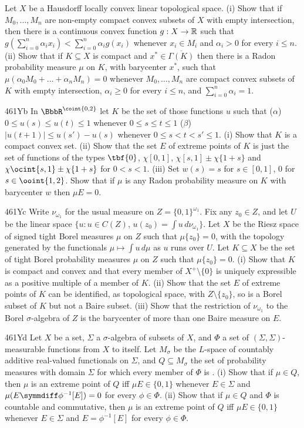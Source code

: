 {
Let $X$ be a Hausdorff locally convex linear topological space.   (i)
Show that if $M_0,\ldots,M_n$ are non-empty compact convex subsets of
$X$ with empty
intersection, then there is a continuous convex function $g:X\to\Bbb R$
such that $g(\sum_{i=0}^n\alpha_ix_i)<\sum_{i=0}^n\alpha_ig(x_i)$
whenever $x_i\in M_i$ and
$\alpha_i>0$ for every $i\le n$.   (ii) Show that if $K\subseteq X$ is
compact and $x^*\in\overline{\Gamma(K)}$ then there is a Radon
probability measure $\mu$ on $K$,
with barycenter $x^*$, such that $\mu(\alpha_0M_0+\ldots+\alpha_nM_n)=0$
whenever $M_0,\ldots,M_n$ are compact convex subsets of $K$ with empty
intersection, $\alpha_i\ge 0$ for every
$i\le n$, and $\sum_{i=0}^n\alpha_i=1$.

\spheader 461Yb
In $\BbbR^{\coint{0,2}}$ let $K$ be the set of those functions $u$ such
that ($\alpha$) $0\le u(s)\le u(t)\le 1$ whenever $0\le s\le t\le 1$
($\beta$) $|u(t+1)|\le u(s')-u(s)$ whenever $0\le s<t<s'\le 1$.   (i)
Show that $K$ is a compact convex set.   (ii) Show that the set $E$ of
extreme points of $K$ is just the set of functions of the types
$\tbf{0}$, $\chi[0,1]$, $\chi[s,1]\pm\chi\{1+s\}$ and
$\chi\ocint{s,1}\pm\chi\{1+s\}$ for $0<s<1$.   (iii) Set $w(s)=s$ for
$s\in[0,1]$, $0$ for $s\in\ooint{1,2}$.   Show that if $\mu$ is any
Radon probability measure on $K$ with barycenter $w$ then $\mu E=0$.

\spheader 461Yc Write $\nu_{\omega_1}$ for the usual measure on
$Z=\{0,1\}^{\omega_1}$.   Fix any $z_0\in Z$, and let $U$ be the linear
space $\{u:u\in C(Z)$, $u(z_0)=\int u\,d\nu_{\omega_1}\}$.   Let $X$ be the
Riesz space of signed tight Borel measures $\mu$ on $Z$ such that
$\mu\{z_0\}=0$,
with the topology generated by the functionals $\mu\mapsto\int u\,d\mu$ as
$u$ runs over $U$.    Let $K\subseteq X$ be the set of tight Borel
probability measures $\mu$ on $Z$ such that $\mu\{z_0\}=0$.
(i) Show that $K$
is compact and convex and that every member of $X^+\setminus\{0\}$ is
uniquely expressible as a positive multiple of a member of $K$.   (ii) Show
that the set $E$ of extreme points of $K$ can be identified, as topological
space, with $Z\setminus\{z_0\}$, so is a Borel subset of $K$ but not a
Baire subset.   (iii) Show that the restriction of $\nu_{\omega_1}$ to the
Borel $\sigma$-algebra of $Z$ is the barycenter of more than
one Baire measure on $E$.

\spheader 461Yd Let $X$ be a set, $\Sigma$ a
$\sigma$-algebra of subsets of $X$, and $\Phi$ a set of
$(\Sigma,\Sigma)$-measurable functions from $X$ to itself.   Let
$M_{\sigma}$ be the
$L$-space of countably additive real-valued functionals on $\Sigma$, and
$Q\subseteq M_{\sigma}$ the set of probability measures with domain
$\Sigma$ for which every member of $\Phi$ is \imp.   (i) Show that if
$\mu\in Q$, then $\mu$ is an extreme point of $Q$ iff $\mu E\in\{0,1\}$
whenever $E\in\Sigma$ and $\mu(E\symmdiff\phi^{-1}[E])=0$ for every
$\phi\in\Phi$.
(ii) Show that if $\mu\in Q$ and $\Phi$ is countable and commutative,
then $\mu$ is an extreme point of $Q$ iff $\mu E\in\{0,1\}$ whenever
$E\in\Sigma$ and $E=\phi^{-1}[E]$ for every $\phi\in\Phi$.

}

